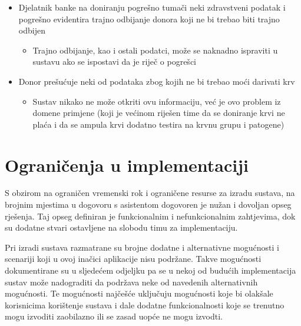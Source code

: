 \begin{itemize}
                \item Djelatnik banke na doniranju pogrešno tumači neki zdravstveni podatak i pogrešno evidentira trajno odbijanje donora koji ne bi trebao biti trajno odbijen
                \begin{itemize}
                    \item Trajno odbijanje, kao i ostali podatci, može se naknadno ispraviti u sustavu ako se ispostavi da je riječ o pogrešci
                \end{itemize}
                
                \item Donor prešućuje neki od podataka zbog kojih ne bi trebao moći darivati krv
                \begin{itemize}
                    \item Sustav nikako ne može otkriti ovu informaciju, već je ovo problem iz domene primjene (koji je većinom riješen time da se doniranje krvi ne plaća i da se ampula krvi dodatno testira na krvnu grupu i patogene)
                \end{itemize}
                
            \end{itemize}
        
        
        \section{Ograničenja u implementaciji}
            
            \par{
            S obzirom na ograničen vremenski rok i ograničene resurse za izradu sustava, na brojnim mjestima u dogovoru s asistentom dogovoren je nužan i dovoljan opseg rješenja. Taj opseg definiran je funkcionalnim i nefunkcionalnim zahtjevima, dok su dodatne stvari ostavljene na slobodu timu za implementaciju.
            }
            \par{
            Pri izradi sustava razmatrane su brojne dodatne i alternativne mogućnosti i scenariji koji u ovoj inačici aplikacije nisu podržane. Takve mogućnosti dokumentirane su u sljedećem odjeljku pa se u nekoj od budućih implementacija sustav može nadograditi da podržava neke od navedenih alternativnih mogućnosti. Te mogućnosti najčešće uključuju mogućnosti koje bi olakšale korisnicima korištenje sustava i dale dodatne funkcionalnosti koje se trenutno mogu izvoditi zaobilazno ili se zasad uopće ne mogu izvodti.
            }
        

